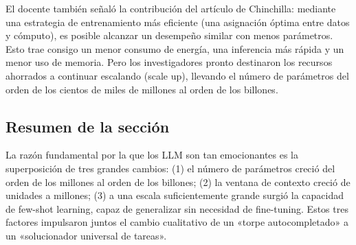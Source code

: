 El docente también señaló la contribución del artículo de Chinchilla: mediante una estrategia de entrenamiento más eficiente (una asignación óptima entre datos y cómputo), es posible alcanzar un desempeño similar con menos parámetros. Esto trae consigo un menor consumo de energía, una inferencia más rápida y un menor uso de memoria. Pero los investigadores pronto destinaron los recursos ahorrados a continuar escalando (scale up), llevando el número de parámetros del orden de los cientos de miles de millones al orden de los billones.

\subsection{Resumen de la sección}

La razón fundamental por la que los LLM son tan emocionantes es la superposición de tres grandes cambios: (1) el número de parámetros creció del orden de los millones al orden de los billones; (2) la ventana de contexto creció de unidades a millones; (3) a una escala suficientemente grande surgió la capacidad de few-shot learning, capaz de generalizar sin necesidad de fine-tuning. Estos tres factores impulsaron juntos el cambio cualitativo de un «torpe autocompletado» a un «solucionador universal de tareas».

